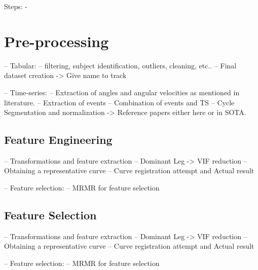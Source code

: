 {%



Steps:
- 


\section{Pre-processing}\label{sec:method-preprocessing}
-- Tabular:
    -- filtering, subject identification, outliers, cleaning, etc..
    -- Final dataset creation -> Give name to track

-- Time-series:
    -- Extraction of angles and angular velocities as mentioned in literature.
    -- Extraction of events
    -- Combination of events and TS
    -- Cycle Segmentation and normalization -> Reference papers either here or in SOTA.

\subsection{Feature Engineering}\label{subsec:method-feature-engineering}
-- Transformations and feature extraction
    -- Dominant Leg -> VIF reduction
    -- Obtaining a representative curve
        -- Curve registration attempt and Actual result

-- Feature selection:
    -- MRMR for feature selection

\subsection{Feature Selection}\label{subsec:method-feature-selection}
-- Transformations and feature extraction
    -- Dominant Leg -> VIF reduction
    -- Obtaining a representative curve
        -- Curve registration attempt and Actual result

-- Feature selection:
    -- MRMR for feature selection


}
